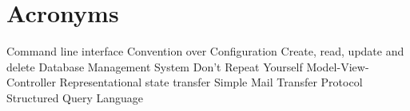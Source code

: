 \newpage
\section*{Acronyms}
\begin{acronym}
	  {Command line interface}
	  {Convention over Configuration}
	 {Create, read, update and delete}
	 {Database Management System}
	  {Don't Repeat Yourself}
	  {Model-View-Controller}
	 {Representational state transfer}
	 {Simple Mail Transfer Protocol}
	  {Structured Query Language}
\end{acronym}
